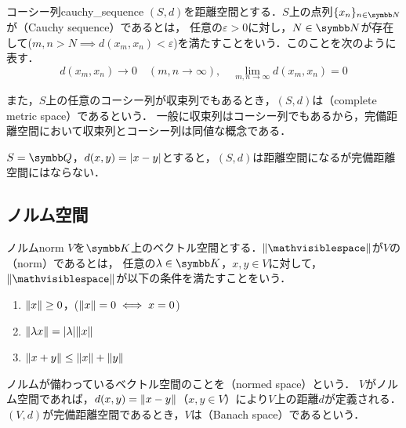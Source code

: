 \documentclass[../../main]{subfiles}
\begin{document}
\begin{definition}{コーシー列}{cauchy_sequence}
  \((S,d)\)を距離空間とする．\(S\)上の点列\(\seq{x_n}_{n\in\numset{N}}\)が（Cauchy sequence）であるとは，
  任意の\(\varepsilon>0\)に対し，\(N\in\numset{N}\)が存在して(\(m,n>N\implies d(x_m,x_n)<\varepsilon\))を満たすことをいう．このことを次のように表す．
  \[
    d(x_m,x_n) \to 0\quad(m,n\to\infty),
    \quad\lim_{m,n\to\infty}d(x_m,x_n) = 0
  \]
\end{definition}

また，\(S\)上の任意のコーシー列が収束列でもあるとき，\((S,d)\)は（complete metric space）であるという．
一般に収束列はコーシー列でもあるから，完備距離空間において収束列とコーシー列は同値な概念である．

\begin{example}
  \(S=\numset{Q}\)，\(d(x,y)=\lvert x-y\rvert\)とすると，\((S,d)\)は距離空間になるが完備距離空間にはならない．
\end{example}

\subsection{ノルム空間}

\begin{definition}{ノルム}{norm}\indexsymbol{\(\vnorm{\holder}\)}
  \(V\)を\(\numset{K}\)上のベクトル空間とする．\(\vnorm{\holder}\)が\(V\)の（norm）であるとは，
  任意の\(\lambda\in\numset{K}\)，\(x,y\in V\)に対して，\(\vnorm{\holder}\)が以下の条件を満たすことをいう．
  \begin{enumerate}
    \item \(\lVert x\rVert\geq 0\)，(\(\lVert x\rVert=0\iff x=0\))
    \item \(\lVert\lambda x\rVert=\lvert\lambda\rvert\lVert x\rVert\)
    \item \(\lVert x+y\rVert\leq\lVert x\rVert+\lVert y\rVert\)
  \end{enumerate}
\end{definition}

ノルムが備わっているベクトル空間のことを（normed space）という．
\(V\)がノルム空間であれば，\(d(x,y)=\lVert x-y\rVert\)（\(x,y\in V\)）により\(V\)上の距離\(d\)が定義される．
\((V,d)\)が完備距離空間であるとき，\(V\)は（Banach space）であるという．
\end{document}
